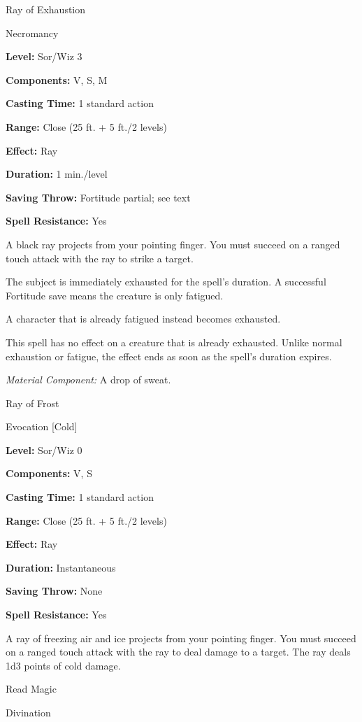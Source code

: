 \documentclass{article}
\begin{document}
\vspace{12pt}
Ray of Exhaustion

Necromancy

\textbf{Level:} Sor/Wiz 3

\textbf{Components:} V, S, M

\textbf{Casting Time:} 1 standard action

\textbf{Range:} Close (25 ft. + 5 ft./2 levels)

\textbf{Effect:} Ray

\textbf{Duration:} 1 min./level

\textbf{Saving Throw:} Fortitude partial; see text

\textbf{Spell Resistance:} Yes

A black ray projects from your pointing finger. You must succeed on a ranged touch 
attack with the ray to strike a target.

The subject is immediately exhausted for the spell's duration. A successful Fortitude 
save means the creature is only fatigued.

A character that is already fatigued instead becomes exhausted.

This spell has no effect on a creature that is already exhausted. Unlike normal 
exhaustion or fatigue, the effect ends as soon as the spell's duration expires.

\textit{Material Component: }A drop of sweat.

\vspace{12pt}
Ray of Frost

Evocation [Cold]

\textbf{Level:} Sor/Wiz 0

\textbf{Components:} V, S

\textbf{Casting Time:} 1 standard action

\textbf{Range:} Close (25 ft. + 5 ft./2 levels)

\textbf{Effect:} Ray

\textbf{Duration:} Instantaneous

\textbf{Saving Throw:} None

\textbf{Spell Resistance:} Yes

A ray of freezing air and ice projects from your pointing finger. You must succeed 
on a ranged touch attack with the ray to deal damage to a target. The ray deals 
1d3 points of cold damage.

\vspace{12pt}
Read Magic

Divination
\end{document}
